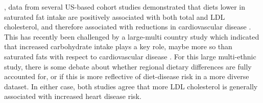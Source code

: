 \documentclass{tufte-handout}
\begin{document}
, data from several US-based cohort studies demonstrated that diets lower in saturated fat intake are positively associated with both total and LDL cholesterol, and therefore associated with reductions in cardiovascular disease \citep{Anderson1987,Wang2016b}.  This has recently been challenged by a large-multi country study which indicated that increased carbohydrate intake plays a key role, maybe more so than saturated fats with respect to cardiovascular disease \citep{Dehghan2017}.  For this large multi-ethnic study, there is some debate about whether regional dietary differences are fully accounted for, or if this is more reflective of diet-disease risk in a more diverse dataset.  In either case, both studies agree that more LDL cholesterol is generally associated with increased heart disease risk.



\end{document}
